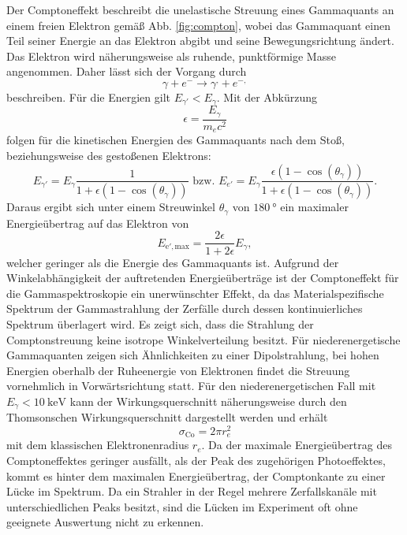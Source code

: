 Der Comptoneffekt beschreibt die unelastische Streuung eines Gammaquants an einem freien Elektron gemäß Abb. \ref{fig:compton}, wobei das Gammaquant einen Teil seiner Energie an das Elektron abgibt und seine Bewegungsrichtung ändert. Das Elektron wird näherungsweise als ruhende, punktförmige Masse angenommen. Daher lässt sich der Vorgang durch
\begin{equation}
    \gamma + e^- \to \gamma^{,} + e^{-,}
\end{equation}
beschreiben. Für die Energien gilt $E_{\gamma'} < E_\gamma$.
Mit der Abkürzung
\begin{equation}
    \epsilon = \frac{E_\gamma}{m_e c^2} \label{eq:eps}
\end{equation}
folgen für die kinetischen Energien des Gammaquants nach dem Stoß, beziehungsweise des gestoßenen Elektrons:
\begin{equation}
    E_{\gamma'} =  E_\gamma \frac{1}{1+ \epsilon (1-\cos(\theta_\gamma))} \text{ bzw. } E_{e'} =  E_\gamma \frac{\epsilon (1-\cos(\theta_\gamma))}{1+ \epsilon (1-\cos(\theta_\gamma))} . \label{eq:ecomp}
\end{equation}
Daraus ergibt sich unter einem Streuwinkel $\theta_\gamma$ von $\SI{180}{\degree}$ ein maximaler Energieübertrag auf das Elektron von
\begin{equation}
    E_{\text{e}',\text{max}} = \frac{2 \epsilon}{1 + 2 \epsilon} E_\gamma , \label{eq:emaxcomp}
\end{equation}
welcher geringer als die Energie des Gammaquants ist. %
Aufgrund der Winkelabhängigkeit der auftretenden Energieüberträge ist der Comptoneffekt für die Gammaspektroskopie ein unerwünschter Effekt, da das Materialspezifische Spektrum der Gammastrahlung der Zerfälle durch dessen kontinuierliches Spektrum überlagert wird.%
 Es zeigt sich, dass die Strahlung der Comptonstreuung keine isotrope Winkelverteilung besitzt. Für niederenergetische Gammaquanten zeigen sich Ähnlichkeiten zu einer Dipolstrahlung, bei hohen Energien oberhalb der Ruheenergie von Elektronen findet die Streuung vornehmlich in Vorwärtsrichtung statt. Für den niederenergetischen Fall mit $E_\gamma < \SI{10}{\kilo\electronvolt}$ kann der Wirkungsquerschnitt näherungsweise durch den Thomsonschen Wirkungsquerschnitt dargestellt werden und erhält
\begin{equation}
    \sigma_\text{Co} = 2 \pi r_e^2
\end{equation}
mit dem klassischen Elektronenradius $r_e$. Da der maximale Energieübertrag des Comptoneffektes geringer ausfällt, als der Peak des zugehörigen Photoeffektes, kommt es hinter dem maximalen Energieübertrag, der Comptonkante zu einer Lücke im Spektrum. Da ein Strahler in der Regel mehrere Zerfallskanäle mit unterschiedlichen Peaks besitzt, sind die Lücken im Experiment oft ohne geeignete Auswertung nicht zu erkennen.%

